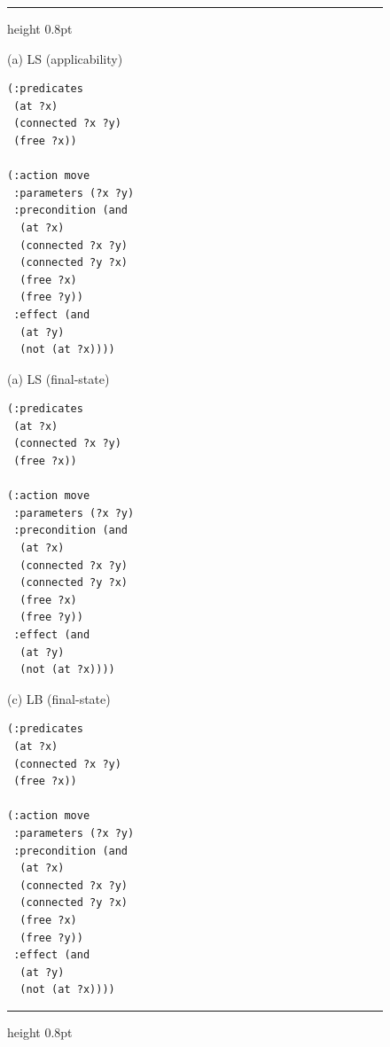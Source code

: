 \begingroup
\begin{figure}[t]
\centering
\hrule height 0.8pt
\vspace{0.6em}
\noindent
\begin{minipage}[t]{0.33\textwidth}
\vspace{0pt}
{\centering (a) LS (applicability)\par}
\begin{lstlisting}
(:predicates
 (at ?x)
 (connected ?x ?y)
 (free ?x))

(:action move
 :parameters (?x ?y)
 :precondition (and
  (at ?x)
  (connected ?x ?y)
  (connected ?y ?x)
  (free ?x)
  (free ?y))
 :effect (and
  (at ?y)
  (not (at ?x))))
\end{lstlisting}
\end{minipage}\hfill%
\begin{minipage}[t]{0.33\textwidth}
\vspace{0pt}
{\centering (a) LS (final-state)\par}
\begin{lstlisting}
(:predicates
 (at ?x)
 (connected ?x ?y)
 (free ?x))

(:action move
 :parameters (?x ?y)
 :precondition (and
  (at ?x)
  (connected ?x ?y)
  (connected ?y ?x)
  (free ?x)
  (free ?y))
 :effect (and
  (at ?y)
  (not (at ?x))))
\end{lstlisting}
\end{minipage}\hfill%
\begin{minipage}[t]{0.33\textwidth}
\vspace{0pt}
{\centering (c) LB (final-state)\par}
\begin{lstlisting}
(:predicates
 (at ?x)
 (connected ?x ?y)
 (free ?x))

(:action move
 :parameters (?x ?y)
 :precondition (and
  (at ?x)
  (connected ?x ?y)
  (connected ?y ?x)
  (free ?x)
  (free ?y))
 :effect (and
  (at ?y)
  (not (at ?x))))
\end{lstlisting}
\end{minipage}%
\par\vspace{0.6em}
\hrule height 0.8pt
\captionsetup{position=bottom}
\label{lst:mazefree_full}
\end{figure}
\endgroup